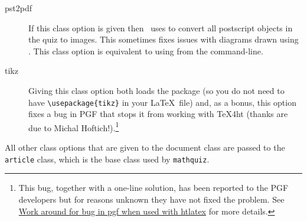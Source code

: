 \documentclass[svgnames]{article}
\begin{document}
\begin{description}
  \item[pst2pdf] If this class option is given then \MathQuiz\ uses
   to convert all postscript objects in the quiz to
  images. This sometimes fixes issues with diagrams drawn using
  . This class option is equivalent to using
   from the command-line.

  \item[tikz] Giving this class option both loads the  package (so you do
  not need to have \Verb|\usepackage{tikz}| in your \LaTeX\ file) and,
  as a bonus, this option fixes a bug in PGF that
  stops it from working with \TeX 4ht (thanks are due to Michal
  Hoftich!).\footnote{This bug, together with a one-line solution, has
  been reported to the PGF developers but for reasons unknown they have
  not fixed the problem. See
    \href{https://tex.stackexchange.com/questions/386757}{Work around for bug in pgf when used with htlatex}
  for more details.}
\end{description}

All other class options that are given to the \MathQuiz document class
are passed to the \texttt{article} class, which is the base class used
by \texttt{mathquiz}.
\end{document}
